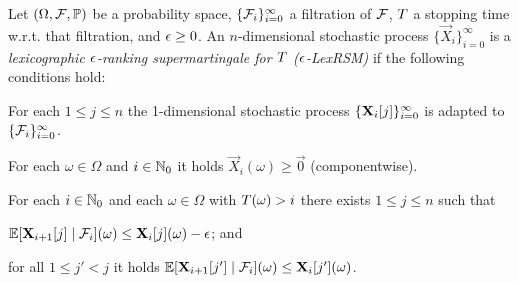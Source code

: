 \begin{definition}
Let $(\Omega,\mathcal{F},\mathbb{P})$ be a probability space, 
$\{\mathcal{F}_i\}_{i=0}^{\infty}$ a filtration of $\mathcal{F}$, $T$ a stopping 
time w.r.t. that filtration, and 
$\epsilon\geq 0$. 
An $n$-dimensional stochastic process $\{\vec{X}_{i}\}_{i=0}^{\infty}$ is a 
\emph{lexicographic $\epsilon$-ranking supermartingale for $T$ 
($\epsilon$-LexRSM)} if the 
following 
conditions hold:
\begin{compactenum}
\item For each $1\leq j \leq n$ the 1-dimensional stochastic process 
$\{\mathbf{X}_{i}[j]\}_{i=0}^{\infty}$ is adapted to 
$\{\mathcal{F}_i\}_{i=0}^{\infty}$.
\item For each $\omega \in \Omega$ and $i\in \mathbb{N}_0$ it holds 
$\vec{X}_i (\omega)\geq \vec{0}$ (componentwise).
\item For each $i\in \mathbb{N}_0$ and each $\omega\in \Omega$ with 
$T(\omega)>i$ there exists $1\leq j 
\leq n$ such that
\begin{compactitem}
	\item $\mathbb{E}[\mathbf{X}_{i+1}[j]\mid 
	\mathcal{F}_i](\omega)\leq\mathbf{X}_{i}[j](\omega) - 
	\epsilon$; and
	\item for all $1 \leq j' < j$ it holds $\mathbb{E}[\mathbf{X}_{i+1}[j']\mid 
	\mathcal{F}_i](\omega)\leq\mathbf{X}_{i}[j'](\omega)$.
\end{compactitem}
\end{compactenum}
\end{definition}

